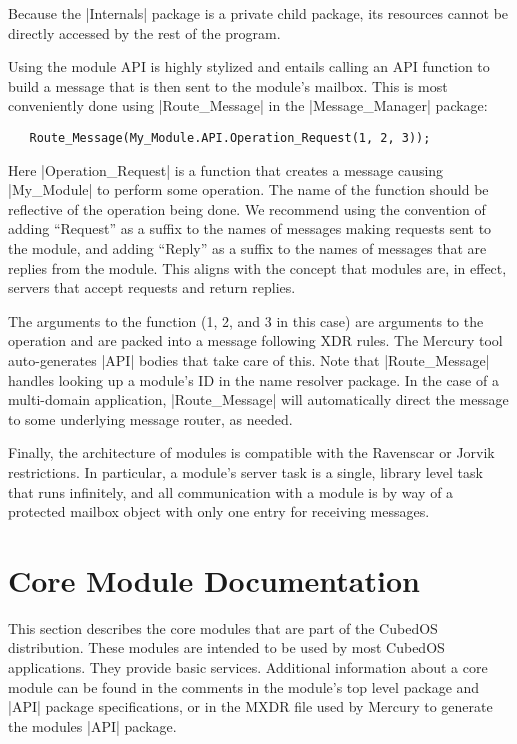 Because the |Internals| package is a private child package, its resources cannot be directly
accessed by the rest of the program.

Using the module API is highly stylized and entails calling an API function to build a message
that is then sent to the module's mailbox. This is most conveniently done using |Route_Message|
in the |Message_Manager| package:

\begin{lstlisting}
   Route_Message(My_Module.API.Operation_Request(1, 2, 3));
\end{lstlisting}

Here |Operation_Request| is a function that creates a message causing |My_Module| to perform
some operation. The name of the function should be reflective of the operation being done. We
recommend using the convention of adding ``Request'' as a suffix to the names of messages making
requests sent to the module, and adding ``Reply'' as a suffix to the names of messages that are
replies from the module. This aligns with the concept that modules are, in effect, servers that
accept requests and return replies.

The arguments to the function (1, 2, and 3 in this case) are arguments to the operation and are
packed into a message following XDR rules. The Mercury tool auto-generates |API| bodies that
take care of this. Note that |Route_Message| handles looking up a module's ID in the name
resolver package. In the case of a multi-domain application, |Route_Message| will automatically
direct the message to some underlying message router, as needed.

Finally, the architecture of modules is compatible with the Ravenscar or Jorvik restrictions. In
particular, a module's server task is a single, library level task that runs infinitely, and all
communication with a module is by way of a protected mailbox object with only one entry for
receiving messages.

\section{Core Module Documentation}
\label{sec:core-module-documentation}

This section describes the core modules that are part of the CubedOS distribution. These modules
are intended to be used by most CubedOS applications. They provide basic services. Additional
information about a core module can be found in the comments in the module's top level package
and |API| package specifications, or in the MXDR file used by Mercury to generate the modules
|API| package.

